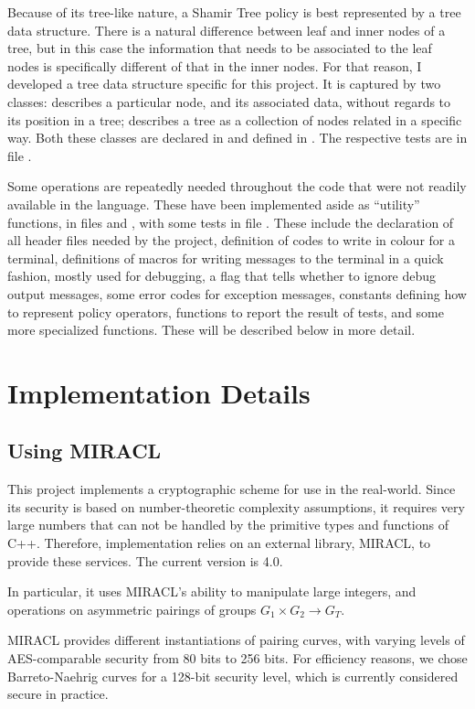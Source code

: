\documentclass{article}
\begin{document}
Because of its tree-like nature, a Shamir Tree policy is best represented by a tree data structure. There is a natural difference between leaf and inner nodes of a tree, but in this case the information that needs to be associated to the leaf nodes is specifically different of that in the inner nodes. For that reason, I developed a tree data structure specific for this project. It is captured by two classes: \cnode describes a particular node, and its associated data, without regards to its position in a tree; \ctree describes a tree as a collection of nodes related in a specific way. Both these classes are declared in \fhtree and defined in \fctree. The respective tests are in file \fttree.

Some operations are repeatedly needed throughout the code that were not readily available in the language. These have been implemented aside as ``utility'' functions, in files \fhutils and \fcutils, with some tests in file \ftutils. These include the declaration of all header files needed by the project, definition of codes to write in colour for a terminal, definitions of macros for writing messages to the terminal in a quick fashion, mostly used for debugging, a flag that tells whether to ignore debug output messages, some error codes for exception messages, constants defining how to represent policy operators, functions to report the result of tests, and some more specialized functions. These will be described below in more detail.


\section{Implementation Details}

\subsection{Using MIRACL}

This project implements a cryptographic scheme for use in the real-world. Since its security is based on number-theoretic complexity assumptions, it requires very large numbers that can not be handled by the primitive types and functions of C++. Therefore, implementation relies on an external library, MIRACL, to provide these services. The current version is 4.0.

In particular, it uses MIRACL's ability to manipulate large integers, and operations on asymmetric pairings of groups $G_1 \times G_2 \to G_T$.

MIRACL provides different instantiations of pairing curves, with varying levels of AES-comparable security from 80 bits to 256 bits. For efficiency reasons, we chose Barreto-Naehrig curves for a 128-bit security level, which is currently considered secure in practice. 
\end{document}
